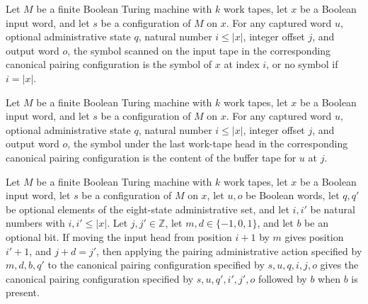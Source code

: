 \begin{lemma}
\label{Complexity.satPairCfg_input}
\leanok
{}
Let $M$ be a finite Boolean Turing machine with $k$ work tapes, let $x$ be a Boolean
input word, and let $s$ be a configuration of $M$ on $x$. For any captured word $u$,
optional administrative state $q$, natural number $i\le |x|$, integer offset $j$, and
output word $o$, the symbol scanned on the input tape in the corresponding canonical
pairing configuration is the symbol of $x$ at index $i$, or no symbol if $i=|x|$.
\end{lemma}

\begin{lemma}
\label{Complexity.satPairCfg_work}
\leanok
{}
Let $M$ be a finite Boolean Turing machine with $k$ work tapes, let $x$ be a Boolean
input word, and let $s$ be a configuration of $M$ on $x$. For any captured word $u$,
optional administrative state $q$, natural number $i\le |x|$, integer offset $j$, and
output word $o$, the symbol under the last work-tape head in the corresponding canonical
pairing configuration is the content of the buffer tape for $u$ at $j$.
\end{lemma}

\begin{lemma}
\label{Complexity.satPairAction_apply}
\leanok
{}
Let $M$ be a finite Boolean Turing machine with $k$ work tapes, let $x$ be a Boolean
input word, let $s$ be a configuration of $M$ on $x$, let $u,o$ be Boolean words, let
$q,q'$ be optional elements of the eight-state administrative set, and let $i,i'$ be
natural numbers with $i,i'\le |x|$. Let $j,j'\in\mathbb Z$, let $m,d\in\{-1,0,1\}$, and
let $b$ be an optional bit. If moving the input head from position $i+1$ by $m$ gives
position $i'+1$, and $j+d=j'$, then applying the pairing administrative action specified
by $m,d,b,q'$ to the canonical pairing configuration specified by $s,u,q,i,j,o$ gives
the canonical pairing configuration specified by $s,u,q',i',j',o$ followed by $b$ when
$b$ is present.
\end{lemma}

